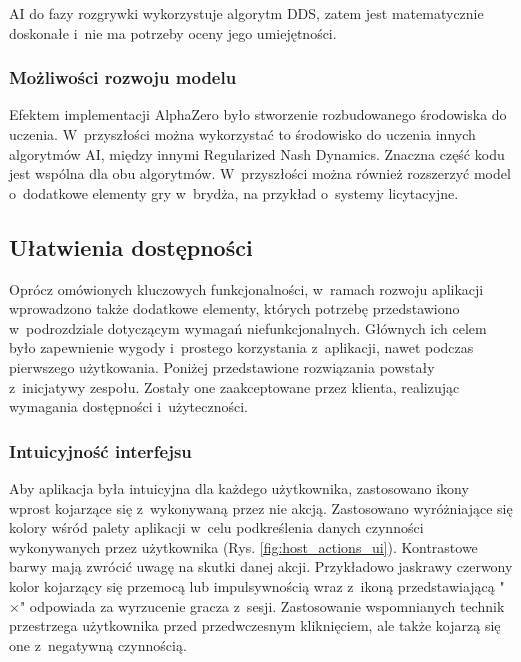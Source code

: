 AI do fazy rozgrywki wykorzystuje algorytm DDS,
zatem jest matematycznie doskonałe i~nie ma potrzeby
oceny jego umiejętności.


\subsubsection{Możliwości rozwoju modelu}

Efektem implementacji AlphaZero było stworzenie
rozbudowanego środowiska do uczenia.
W~przyszłości można wykorzystać to środowisko
do uczenia innych algorytmów AI, między innymi
Regularized Nash Dynamics.
Znaczna część kodu jest wspólna dla obu algorytmów.
W~przyszłości można również rozszerzyć
model o~dodatkowe elementy gry w~brydża,
na przykład o~systemy licytacyjne.



\subsection{Ułatwienia dostępności}

Oprócz omówionych kluczowych funkcjonalności, w~ramach rozwoju
aplikacji wprowadzono także dodatkowe elementy, których
potrzebę przedstawiono w~podrozdziale dotyczącym wymagań
niefunkcjonalnych. Głównych ich celem było zapewnienie
wygody i~prostego korzystania z~aplikacji, nawet podczas
pierwszego użytkowania. Poniżej przedstawione rozwiązania powstały
z~inicjatywy zespołu. Zostały one zaakceptowane przez klienta,
realizując wymagania dostępności i~użyteczności.

\subsubsection{Intuicyjność interfejsu}

Aby aplikacja była intuicyjna dla każdego użytkownika,
zastosowano ikony wprost kojarzące się z~wykonywaną
przez nie akcją. Zastosowano wyróżniające się kolory wśród palety
aplikacji w~celu podkreślenia danych czynności wykonywanych
przez użytkownika (Rys. \ref{fig:host_actions_ui}). Kontrastowe barwy mają zwrócić uwagę na
skutki danej akcji. Przykładowo jaskrawy czerwony kolor
kojarzący się przemocą lub impulsywnością wraz z~ikoną
przedstawiającą "$\times$"\xspace odpowiada za wyrzucenie gracza
z~sesji. Zastosowanie wspomnianych technik przestrzega
użytkownika przed przedwczesnym kliknięciem, ale także kojarzą
się one z~negatywną czynnością.

